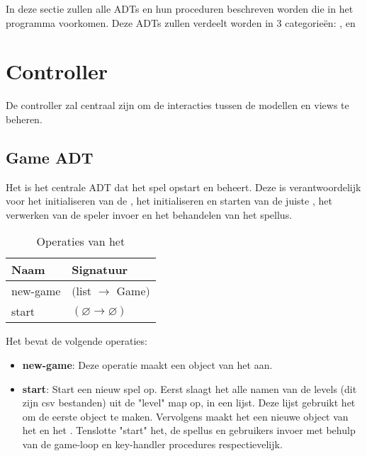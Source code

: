 In deze sectie zullen alle ADTs en hun proceduren beschreven worden 
die in het programma voorkomen.
Deze ADTs zullen verdeelt worden in 3 categorieën:
,
 en
\section{Controller}
\label{controller}
De controller zal centraal zijn om de interacties tussen de modellen en views te beheren. 

\subsection{Game ADT}
\label{section:game}
Het \texttt{} is het centrale ADT dat het spel opstart en beheert.
Deze is verantwoordelijk voor
het initialiseren van de \texttt{},
het initialiseren en starten van de juiste \texttt{},
het verwerken van de speler invoer
en het behandelen van het spellus.

\begin{table}[hbt]
\centering
\begin{tabular}{|ll|}
\hline
\rowcolor[HTML]{000000} 
{\color[HTML]{FFFFFF} \textbf{Naam}} & {\color[HTML]{FFFFFF} \textbf{Signatuur}} \\ \hline
new-game    & $($list $\rightarrow$ Game$)$                  \\ \hline
start       & $(\varnothing \rightarrow \varnothing)$        \\ \hline
\end{tabular}
\caption{Operaties van het \texttt{}}
\label{table:1}
\end{table}

Het \texttt{} bevat de volgende operaties:

\begin{itemize}
	\item \textbf{new-game}: Deze operatie maakt een object van het \texttt{} aan.
	\item \textbf{start}: Start een nieuw spel op.
		Eerst slaagt het alle namen van de levels (dit zijn csv bestanden) uit de "level" map op, in een lijst.
		Deze lijst gebruikt het om de eerste \texttt{} object te maken.
		Vervolgens maakt het een nieuwe object van het \texttt{} en het \texttt{}.
		Tenslotte "start" het, de spellus en gebruikers invoer met behulp van de game-loop en key-handler procedures respectievelijk. 
\end{itemize}

